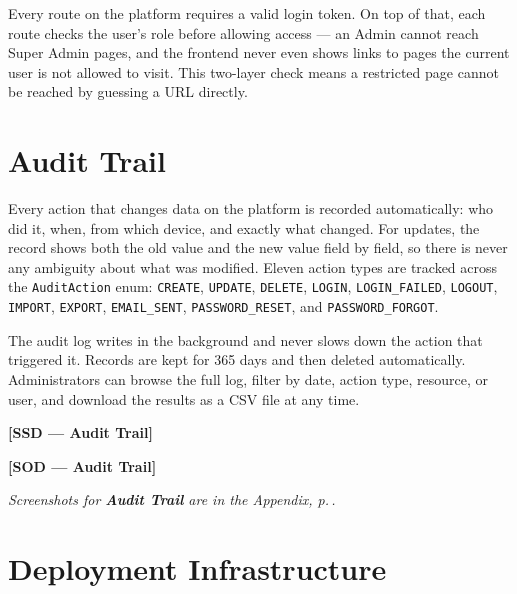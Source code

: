 \documentclass[12pt,a4paper]{report}
\newcommand{\ssd}[1]{\begin{placeholder}\textbf{[SSD --- #1]}\end{placeholder}\vspace{2pt}}
\newcommand{\sod}[1]{\begin{placeholder}\textbf{[SOD --- #1]}\end{placeholder}\vspace{4pt}}
\newcommand{\annexref}[1]{\begin{screenshotbox}\small\textit{Screenshots for \textbf{#1} are in the Appendix, p.\,\pageref{annex:#1}.}\end{screenshotbox}\vspace{4pt}}
\begin{document}
Every route on the platform requires a valid login token. On top of that, each
route checks the user's role before allowing access --- an Admin cannot reach
Super Admin pages, and the frontend never even shows links to pages the current
user is not allowed to visit. This two-layer check means a restricted page cannot
be reached by guessing a URL directly.

\section{Audit Trail}

Every action that changes data on the platform is recorded automatically: who did
it, when, from which device, and exactly what changed. For updates, the record
shows both the old value and the new value field by field, so there is never any
ambiguity about what was modified. Eleven action types are tracked across the
\texttt{AuditAction} enum: \texttt{CREATE}, \texttt{UPDATE}, \texttt{DELETE},
\texttt{LOGIN}, \texttt{LOGIN\_FAILED}, \texttt{LOGOUT}, \texttt{IMPORT},
\texttt{EXPORT}, \texttt{EMAIL\_SENT}, \texttt{PASSWORD\_RESET}, and
\texttt{PASSWORD\_FORGOT}.

The audit log writes in the background and never slows down the action that triggered
it. Records are kept for 365 days and then deleted automatically. Administrators can
browse the full log, filter by date, action type, resource, or user, and download
the results as a CSV file at any time.

\ssd{Audit Trail}
\sod{Audit Trail}
\annexref{Audit Trail}

\section{Deployment Infrastructure}
\end{document}
